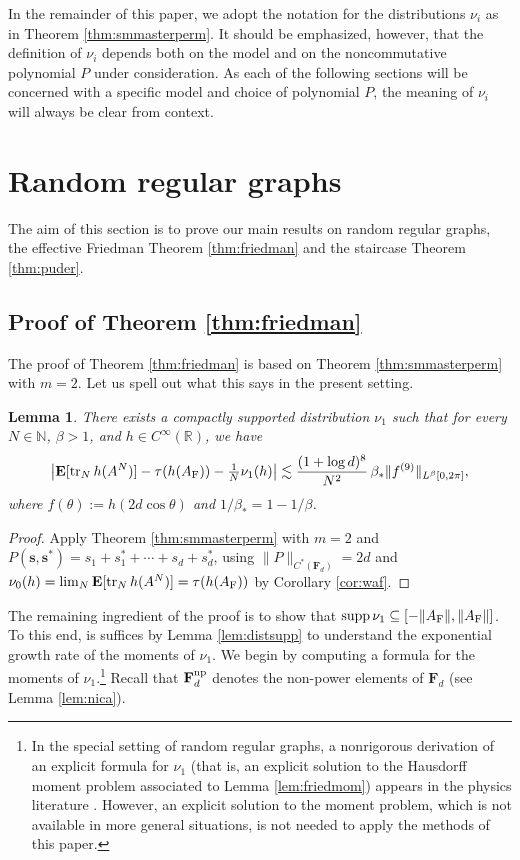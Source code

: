 \documentclass[10pt,reqno]{amsart}
\newtheorem{lem}[thm]{Lemma}
\theoremstyle{definition}
\theoremstyle{remark}
\numberwithin{equation}{section}
\numberwithin{figure}{section}
\numberwithin{table}{section}
\newcommand{\supp}{\mathop{\mathrm{supp}}}
\newcommand{\ntrN}{\mathop{\mathrm{tr}_N}}
\newcommand{\EE}{\mathbf{E}}
\begin{document}
In the remainder of this paper, we adopt the notation for 
the distributions $\nu_i$ as in Theorem \ref{thm:smmasterperm}. It should 
be emphasized, however, that the definition of $\nu_i$ depends both on the 
model and on the noncommutative polynomial $P$ under consideration. As 
each of the following sections will be concerned with a specific model and 
choice of polynomial $P$, the meaning of $\nu_i$ will always be clear from 
context.



\section{Random regular graphs}
\label{sec:rreg}

The aim of this section is to prove our main results on random regular 
graphs, the effective Friedman Theorem \ref{thm:friedman} and the 
staircase Theorem \ref{thm:puder}.


\subsection{Proof of Theorem \ref{thm:friedman}}
\label{sec:friedman}

The proof of Theorem \ref{thm:friedman} is based on Theorem 
\ref{thm:smmasterperm} with $m=2$. Let us spell out what this says in the 
present setting.

\begin{lem}
\label{lem:masterfriedman}
There exists a compactly supported distribution $\nu_1$ such that
for every $N\in\mathbb{N}$, $\beta>1$, and $h\in C^\infty(\mathbb{R})$, we 
have
$$
	\big| \EE[\ntrN h(A^N)] - \tau(h(A_{\rm F})) - \tfrac{1}{N}\nu_1(h)
	\big|
	\lesssim \frac{(1+\log d)^8}{N^2}\, \beta_* \|f^{(9)}\|_{L^\beta[0,2\pi]},
$$
where $f(\theta) := h(2d\cos\theta)$ and $1/\beta_*=1-1/\beta$.
\end{lem}

\begin{proof}
Apply Theorem \ref{thm:smmasterperm} with $m=2$ and
$P(\boldsymbol{s},\boldsymbol{s}^*) =
s_1+s_1^*+\cdots+s_d+s_d^*$, using
$\|P\|_{C^*(\mathbf{F}_d)}=2d$ and $\nu_0(h) =
\lim_N \EE[\ntrN h(A^N)]= \tau(h(A_{\rm F}))$ by Corollary
\ref{cor:waf}.
\end{proof}

The remaining ingredient of the proof is to show that $\supp\nu_1
\subseteq [-\|A_{\rm F}\|,\|A_{\rm F}\|]$. 
To this end, is suffices by Lemma \ref{lem:distsupp} to understand the 
exponential growth rate of the moments of $\nu_1$. 
We begin by computing a formula for the moments of $\nu_1$.\footnote{%
	In the special setting of random regular graphs, a nonrigorous 
	derivation 
	of an explicit formula for $\nu_1$ (that is, an explicit solution 
	to the Hausdorff moment problem associated to Lemma \ref{lem:friedmom})
	appears in the physics literature \cite{MPL14}.
	However, an explicit solution to the moment
	problem, which is not available in more general situations,
	is not needed to apply the methods of this paper.
}
Recall that $\mathbf{F}_d^{\rm np}$ denotes the non-power elements of
$\mathbf{F}_d$ (see Lemma \ref{lem:nica}).
\end{document}

